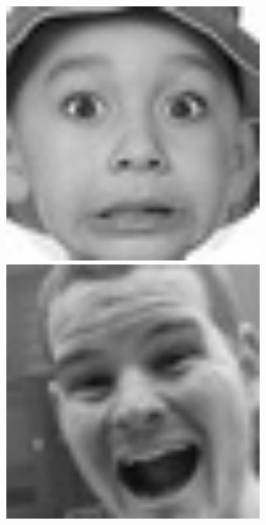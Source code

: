 \begin{frame}
\begin{figure}[!ht]
\begin{minipage}[t]{0.20\textwidth}
    \end{minipage}
    \hfill
    \begin{minipage}[t]{0.20\textwidth}
    \centering
      \includegraphics[width=0.75\textwidth]{images/fer2013/fear.jpg}
    \end{minipage}
    \hfill
    \begin{minipage}[t]{0.20\textwidth}
    \centering
      \includegraphics[width=0.75\textwidth]{images/fer2013/happy.jpg}
    \end{minipage}
    \hfill
    \begin{minipage}[t]{0.20\textwidth}

\end{minipage}
\end{figure}
\end{frame}
